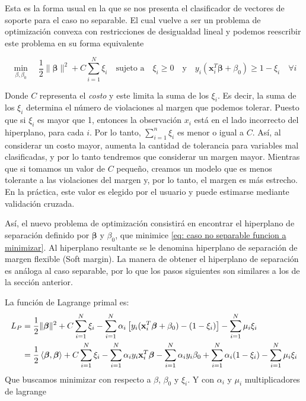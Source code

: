 \documentclass[letterpaper,12pt,oneside]{book}
\newcommand{\inprod}[2]{\left<#1, #2\right>} %
\begin{document}
{{{        Esta es la forma usual en la que se nos presenta el clasificador de vectores de soporte para el caso no separable. El cual vuelve a ser un problema de optimización convexa con restricciones de desigualdad lineal y podemos reescribir este problema en su forma equivalente
        
        \begin{equation}
            \min_{\beta, \beta_0} \quad \frac{1}{2} \|\boldsymbol{\beta}\|^2 + C \sum_{i=1}^{N} \xi_i \quad \text{sujeto a} \quad \xi_i \geq 0 \quad \text{y} \quad y_i (\mathbf{x}_i^T \boldsymbol{\beta} + \beta_0) \geq 1 - \xi_i \quad \forall i \label{eq: caso no separable funcion a minimizar}
        \end{equation}
        
Donde \( C \) representa el \textit{costo} y este limita la suma de los \( \xi_i \). Es decir, la suma de los \( \xi_i \) determina el número de violaciones al margen que podemos tolerar. Puesto que si \( \xi_i \) es mayor que 1, entonces la observación \( x_i \) está en el lado incorrecto del hiperplano, para cada \( i \). Por lo tanto, \( \sum_{i=1}^{n} \xi_i \) es menor o igual a \( C \). Así, al considerar un costo mayor, aumenta la cantidad de tolerancia para variables mal clasificadas, y por lo tanto tendremos que considerar un margen mayor. Mientras que si tomamos un valor de \( C \) pequeño, creamos un modelo que es menos tolerante a las violaciones del margen y, por lo tanto, el margen es más estrecho. En la práctica, este valor es elegido por el usuario y puede estimarse mediante validación cruzada.

Así, el nuevo problema de optimización consistirá en encontrar el hiperplano de separación definido por \( \boldsymbol{\beta} \) y \( \beta_0 \), que minimice \eqref{eq: caso no separable funcion a minimizar}. Al hiperplano resultante se le denomina hiperplano de separación de margen flexible (Soft margin). La manera de obtener el hiperplano de separación es análoga al caso separable, por lo que los pasos siguientes son similares a los de la sección anterior.

        
        La función de Lagrange primal es:
        \begin{align}
            L_P &= \frac{1}{2} \|\boldsymbol{\beta}\|^2 + C \sum_{i=1}^{N} \xi_i - \sum_{i=1}^{N} \alpha_i \left[ y_i (\mathbf{x}_i^T \boldsymbol{\beta} + \beta_0) - (1 - \xi_i) \right] - \sum_{i=1}^{N} \mu_i \xi_i \label{eq: 2.19} \\
            &=\frac{1}{2} \inprod{\boldsymbol{\beta}}{\boldsymbol{\beta}} + C \sum_{i=1}^{N} \xi_i - \sum_{i=1}^{N} \alpha_i  y_i \mathbf{x}_i^T \boldsymbol{\beta} - \sum_{i=1}^{N} \alpha_i  y_i\beta_0 + \sum_{i=1}^{N}\alpha_i(1 - \xi_i)  - \sum_{i=1}^{N} \mu_i \xi_i \notag
        \end{align} 
        Que buscamos minimizar con respecto a $\beta$, $\beta_0$ y $\xi_i$. Y con $\alpha_i$ y $\mu_i$ multiplicadores de lagrange
        
}}}
\end{document}
